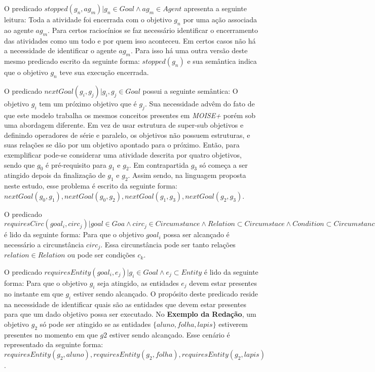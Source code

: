 O predicado $stopped(g_n, ag_m) | g_n \in Goal \wedge ag_m \in Agent$ apresenta a seguinte leitura: Toda a atividade foi encerrada com o objetivo $g_n$ por uma ação associada ao agente $ag_m$. Para certos raciocínios se faz necessário identificar o encerramento das atividades como um todo e por quem isso aconteceu. Em certos casos não há a necessidade de identificar o agente $ag_m$. Para isso há uma outra versão deste mesmo predicado escrito da seguinte forma: $stopped(g_n)$ e sua semântica indica que o objetivo $g_n$ teve sua execução encerrada. 

O predicado $nextGoal(g_i,g_j) |g_i, g_j \in Goal$ possui a seguinte semântica: O objetivo $g_i$ tem um próximo objetivo que é $g_j$. Sua necessidade advêm do fato de que este modelo trabalha os mesmos conceitos presentes em \textit{MOISE+} porém sob uma abordagem diferente. Em vez de usar estrutura de super-sub objetivos e definindo operadores de série e paralelo, os objetivos não possuem estruturas, e suas relações se dão por um objetivo apontado para o próximo. Então, para exemplificar pode-se considerar uma atividade descrita por quatro objetivos, sendo que $g_0$ é pré-requisito para $g_1$ e $g_2$. Em contrapartida $g_3$ só começa a ser atingido depois da finalização de $g_1$ e $g_2$. Assim sendo, na linguagem proposta neste estudo, esse problema é escrito da seguinte forma: $nextGoal(g_0,g_1), nextGoal(g_0,g_2), nextGoal(g_1,g_3), nextGoal(g_2,g_3)$.

O predicado $requiresCirc(goal_i,circ_j) | goal \in Goa \wedge circ_j \in Circumstance \wedge Relation \subset Circumstace \wedge Condition \subset Circumstance$ é lido da seguinte forma: Para que o objetivo $goal_i$ possa ser alcançado é necessário a circunstância $circ_j$. Essa circunstância pode ser tanto relações $relation \in Relation$ ou pode ser condições $c_k$.

O predicado $requiresEntity(goal_i, e_j) | g_i \in Goal \wedge e_j \subset Entity $ é lido da seguinte forma: Para que o objetivo $g_i$ seja atingido, as entidades $e_j$ devem estar presentes no instante em que $g_i$ estiver sendo alcançado. O propósito deste predicado reside na necessidade de identificar quais são as entidades que devem estar presentes para que um dado objetivo possa ser executado. No \textbf{Exemplo da Redação}, um objetivo $g_2$ só pode ser atingido se as entidades $\{ aluno, folha, lapis\}$ estiverem presentes no momento em que $g2$ estiver sendo alcançado. Esse cenário é representado da seguinte forma: $requiresEntity(g_2, aluno), requiresEntity(g_2, folha), requiresEntity(g_2, lapis)$.

